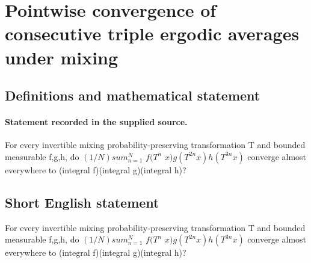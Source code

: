 \documentclass[11pt]{article}
\begin{document}
\section*{Pointwise convergence of consecutive triple ergodic averages under mixing}\label{statement}
\subsection{Definitions and mathematical statement}
\paragraph{Statement recorded in the supplied source.}
For every invertible mixing probability-preserving transformation T and bounded measurable f,g,h, do $(1/N)sum_{n=1}^N$ $f(T^n$ $x)g(T^{2n}x)h(T^{3n}x)$ converge almost everywhere to (integral f)(integral g)(integral h)?
\subsection{Short English statement}
For every invertible mixing probability-preserving transformation T and bounded measurable f,g,h, do $(1/N)sum_{n=1}^N$ $f(T^n$ $x)g(T^{2n}x)h(T^{3n}x)$ converge almost everywhere to (integral f)(integral g)(integral h)?
\end{document}
